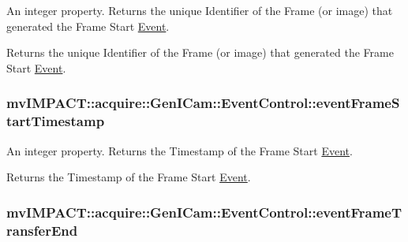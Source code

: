 An integer property. Returns the unique Identifier of the Frame (or image) that generated the Frame Start \hyperlink{classmv_i_m_p_a_c_t_1_1acquire_1_1_event}{Event}. 

Returns the unique Identifier of the Frame (or image) that generated the Frame Start \hyperlink{classmv_i_m_p_a_c_t_1_1acquire_1_1_event}{Event}. \hypertarget{classmv_i_m_p_a_c_t_1_1acquire_1_1_gen_i_cam_1_1_event_control_a58d33b27102e36e3c281c5429ff3d546}{
\subsubsection[{event\+Frame\+Start\+Timestamp}]{ mv\+I\+M\+P\+A\+C\+T\+::acquire\+::\+Gen\+I\+Cam\+::\+Event\+Control\+::event\+Frame\+Start\+Timestamp}}\label{classmv_i_m_p_a_c_t_1_1acquire_1_1_gen_i_cam_1_1_event_control_a58d33b27102e36e3c281c5429ff3d546}


An integer property. Returns the Timestamp of the Frame Start \hyperlink{classmv_i_m_p_a_c_t_1_1acquire_1_1_event}{Event}. 

Returns the Timestamp of the Frame Start \hyperlink{classmv_i_m_p_a_c_t_1_1acquire_1_1_event}{Event}. \hypertarget{classmv_i_m_p_a_c_t_1_1acquire_1_1_gen_i_cam_1_1_event_control_afe2e483b09bba295a83416a21f6e20fc}{
\subsubsection[{event\+Frame\+Transfer\+End}]{ mv\+I\+M\+P\+A\+C\+T\+::acquire\+::\+Gen\+I\+Cam\+::\+Event\+Control\+::event\+Frame\+Transfer\+End}}\label{classmv_i_m_p_a_c_t_1_1acquire_1_1_gen_i_cam_1_1_event_control_afe2e483b09bba295a83416a21f6e20fc}


